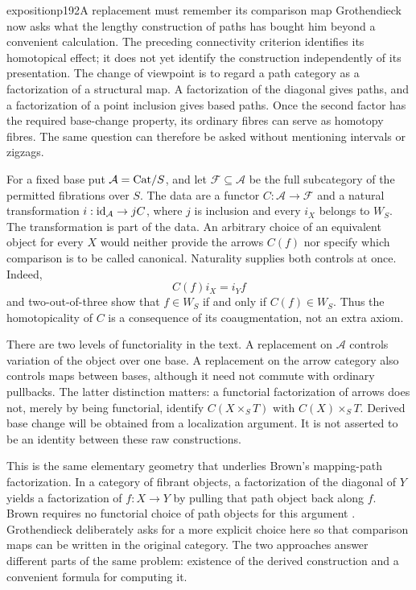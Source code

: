 \begin{dcomment}{exposition}{p192}{A replacement must remember its comparison map}
Grothendieck now asks what the lengthy construction of paths has bought him beyond a convenient calculation. The preceding connectivity criterion identifies its homotopical effect; it does not yet identify the construction independently of its presentation. The change of viewpoint is to regard a path category as a factorization of a structural map. A factorization of the diagonal gives paths, and a factorization of a point inclusion gives based paths. Once the second factor has the required base-change property, its ordinary fibres can serve as homotopy fibres. The same question can therefore be asked without mentioning intervals or zigzags.

For a fixed base put $\mathcal A=\mathrm{Cat}/S$, and let $\mathcal F\subseteq\mathcal A$ be the full subcategory of the permitted fibrations over $S$. The data are a functor $C:\mathcal A\to\mathcal F$ and a natural transformation $i:\mathrm{id}_{\mathcal A}\to jC$, where $j$ is inclusion and every $i_X$ belongs to $W_S$. The transformation is part of the data. An arbitrary choice of an equivalent object for every $X$ would neither provide the arrows $C(f)$ nor specify which comparison is to be called canonical. Naturality supplies both controls at once. Indeed,
\[
 C(f)i_X=i_Yf
\]
and two-out-of-three show that $f\in W_S$ if and only if $C(f)\in W_S$. Thus the homotopicality of $C$ is a consequence of its coaugmentation, not an extra axiom.

There are two levels of functoriality in the text. A replacement on $\mathcal A$ controls variation of the object over one base. A replacement on the arrow category also controls maps between bases, although it need not commute with ordinary pullbacks. The latter distinction matters: a functorial factorization of arrows does not, merely by being functorial, identify $C(X\times_S T)$ with $C(X)\times_S T$. Derived base change will be obtained from a localization argument. It is not asserted to be an identity between these raw constructions.

This is the same elementary geometry that underlies Brown's mapping-path factorization. In a category of fibrant objects, a factorization of the diagonal of $Y$ yields a factorization of $f:X\to Y$ by pulling that path object back along $f$. Brown requires no functorial choice of path objects for this argument \citep[Part I, \S1, pp.~420--422]{Brown1973}. Grothendieck deliberately asks for a more explicit choice here so that comparison maps can be written in the original category. The two approaches answer different parts of the same problem: existence of the derived construction and a convenient formula for computing it.
\end{dcomment}


